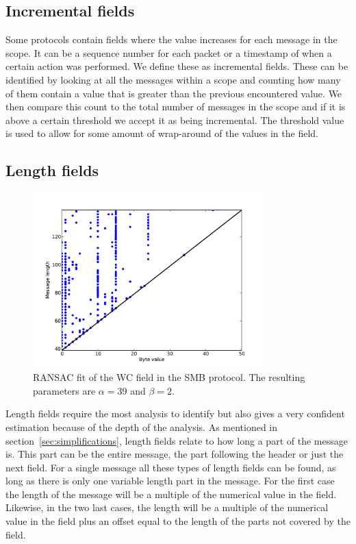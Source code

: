 \documentclass[a4paper]{report}
\begin{document}
\newpage

\subsection{Incremental fields}
Some protocols contain fields where the value increases for each message in the
scope. It can be a sequence number for each packet or a timestamp of when a
certain action was performed. We define these as incremental fields. These can
be identified by looking at all the messages within a scope and counting how
many of them contain a value that is greater than the previous encountered
value. We then compare this count to the total number of messages in the scope
and if it is above a certain threshold we accept it as being incremental. The
threshold value is used to allow for some amount of wrap-around of the values
in the field.

\subsection{Length fields}
\label{sec:length}

\begin{figure}[h]
    \centering
    \includegraphics[width=0.8\textwidth]{img/length}
    \captionsetup{width=0.8\textwidth}
    \caption{RANSAC fit of the WC field in the SMB protocol. The resulting
    parameters are $\alpha = 39$ and $\beta = 2$.}
    \label{fig:length}
\end{figure}

Length fields require the most analysis to identify but also gives a very
confident estimation because of the depth of the analysis. As mentioned in
section~\ref{sec:simplifications}, length fields relate to how long a part of
the message is. This part can be the entire message, the part following the
header or just the next field. For a single message all these types of length
fields can be found, as long as there is only one variable length part in the
message. For the first case the length of the message will be a multiple of the
numerical value in the field. Likewise, in the two last cases, the length will
be a multiple of the numerical value in the field plus an offset equal to the
length of the parts not covered by the field.
\end{document}
